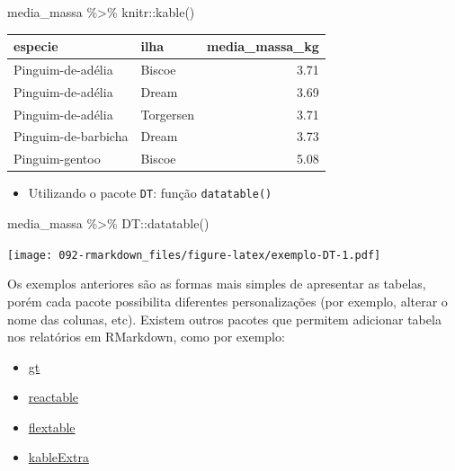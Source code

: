 \documentclass[
]{book}
\newenvironment{Shaded}{\begin{snugshade}}{\end{snugshade}}
\newcommand{\FunctionTok}[1]{\textcolor[rgb]{0.00,0.00,0.00}{#1}}
\newcommand{\NormalTok}[1]{#1}
\newcommand{\SpecialCharTok}[1]{\textcolor[rgb]{0.00,0.00,0.00}{#1}}
\providecommand{\tightlist}{%
  \setlength{\itemsep}{0pt}\setlength{\parskip}{0pt}}
\begin{document}
\begin{Shaded}
\begin{Highlighting}[]
\NormalTok{media\_massa }\SpecialCharTok{\%\textgreater{}\%}
\NormalTok{  knitr}\SpecialCharTok{::}\FunctionTok{kable}\NormalTok{()}
\end{Highlighting}
\end{Shaded}

\begin{tabular}{l|l|r}
\hline
especie & ilha & media\_massa\_kg\\
\hline
Pinguim-de-adélia & Biscoe & 3.71\\
\hline
Pinguim-de-adélia & Dream & 3.69\\
\hline
Pinguim-de-adélia & Torgersen & 3.71\\
\hline
Pinguim-de-barbicha & Dream & 3.73\\
\hline
Pinguim-gentoo & Biscoe & 5.08\\
\hline
\end{tabular}

\begin{itemize}
\tightlist
\item
  Utilizando o pacote \texttt{DT}: função \texttt{datatable()}
\end{itemize}

\begin{Shaded}
\begin{Highlighting}[]
\NormalTok{media\_massa }\SpecialCharTok{\%\textgreater{}\%}
\NormalTok{  DT}\SpecialCharTok{::}\FunctionTok{datatable}\NormalTok{()}
\end{Highlighting}
\end{Shaded}

\texttt{[image: 092-rmarkdown\_files/figure-latex/exemplo-DT-1.pdf]}

Os exemplos anteriores são as formas mais simples de apresentar as tabelas, porém cada pacote possibilita diferentes personalizações (por exemplo, alterar o nome das colunas, etc). Existem outros pacotes que permitem adicionar tabela nos relatórios em RMarkdown, como por exemplo:

\begin{itemize}
\item
  \href{https://gt.rstudio.com/}{gt}
\item
  \href{https://glin.github.io/reactable/index.html}{reactable}
\item
  \href{https://davidgohel.github.io/flextable/articles/overview.html}{flextable}
\item
  \href{https://cran.r-project.org/web/packages/kableExtra/vignettes/awesome_table_in_html.html}{kableExtra}
\end{itemize}
\end{document}
